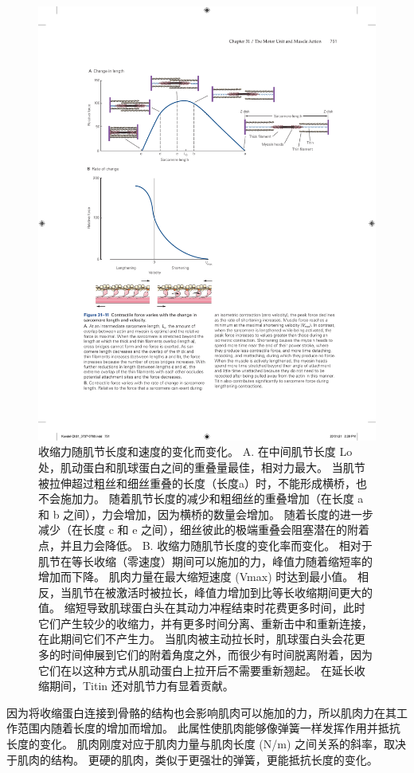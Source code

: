\begin{figure}[htbp]
	\centering
	\includegraphics[width=0.9\linewidth]{chap31/fig_31_11}
	\caption{收缩力随肌节长度和速度的变化而变化。 A. 在中间肌节长度 Lo 处，肌动蛋白和肌球蛋白之间的重叠量最佳，相对力最大。 当肌节被拉伸超过粗丝和细丝重叠的长度（长度a）时，不能形成横桥，也不会施加力。 随着肌节长度的减少和粗细丝的重叠增加（在长度 a 和 b 之间），力会增加，因为横桥的数量会增加。 随着长度的进一步减少（在长度 c 和 e 之间），细丝彼此的极端重叠会阻塞潜在的附着点，并且力会降低。 B. 收缩力随肌节长度的变化率而变化。 相对于肌节在等长收缩（零速度）期间可以施加的力，峰值力随着缩短率的增加而下降。 肌肉力量在最大缩短速度 (Vmax) 时达到最小值。 相反，当肌节在被激活时被拉长，峰值力增加到比等长收缩期间更大的值。 缩短导致肌球蛋白头在其动力冲程结束时花费更多时间，此时它们产生较少的收缩力，并有更多时间分离、重新击中和重新连接，在此期间它们不产生力。 当肌肉被主动拉长时，肌球蛋白头会花更多的时间伸展到它们的附着角度之外，而很少有时间脱离附着，因为它们在以这种方式从肌动蛋白上拉开后不需要重新翘起。 在延长收缩期间，Titin 还对肌节力有显着贡献。}
	\label{fig:31_11}
\end{figure}

因为将收缩蛋白连接到骨骼的结构也会影响肌肉可以施加的力，所以肌肉力在其工作范围内随着长度的增加而增加。 此属性使肌肉能够像弹簧一样发挥作用并抵抗长度的变化。 肌肉刚度对应于肌肉力量与肌肉长度 (N/m) 之间关系的斜率，取决于肌肉的结构。 更硬的肌肉，类似于更强壮的弹簧，更能抵抗长度的变化。

